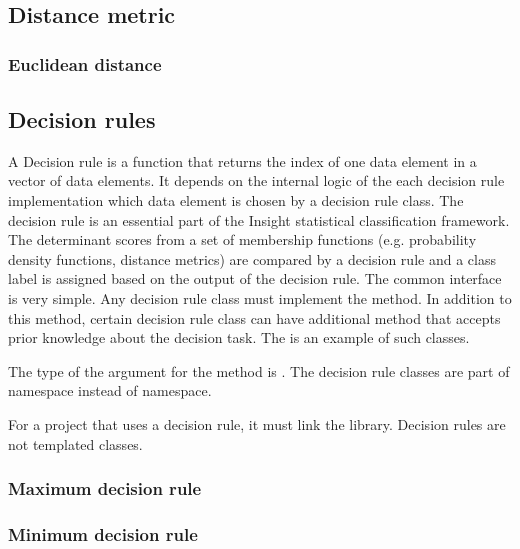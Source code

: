 

\subsection{Distance metric}
\label{sec:DistanceMetric}

\subsubsection{Euclidean distance}
\label{sec:EuclideanDistance}



\subsection{Decision rules}
\label{sec:DecisionRules}

A Decision rule is a function that returns the index of one data
element in a vector of data elements. It depends on the internal logic
of the each decision rule implementation which data element is chosen
by a decision rule class. The decision rule is an essential part of
the Insight statistical classification framework. The determinant
scores from a set of membership functions (e.g. probability density
functions, distance metrics) are compared by a decision rule and a
class label is assigned based on the output of the decision rule. The
common interface is very simple. Any decision rule class must
implement the 
method. In addition to this method, certain decision rule class can
have additional method that accepts prior knowledge about the decision
task. The  is an example of such
classes.

The type of the argument for the  method is
. The decision rule classes are part of
 namespace instead of  namespace.

For a project that uses a decision rule, it must link the 
library. Decision rules are not templated classes.

\subsubsection{Maximum decision rule}
\label{sec:MaximumDecisionRule}



\subsubsection{Minimum decision rule}
\label{sec:MinimumDecisionRule}

